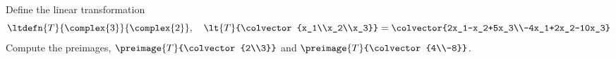 Define the linear transformation
%
\begin{equation*}
\ltdefn{T}{\complex{3}}{\complex{2}},\quad
\lt{T}{\colvector{x_1\\x_2\\x_3}}=\colvector{2x_1-x_2+5x_3\\-4x_1+2x_2-10x_3}
\end{equation*}
%
Compute the preimages, $\preimage{T}{\colvector{2\\3}}$ and $\preimage{T}{\colvector{4\\-8}}$.